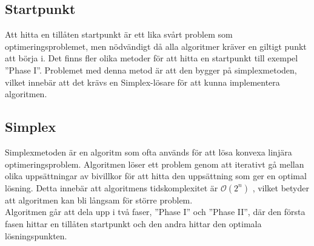 \subsection{Startpunkt}
Att hitta en tillåten startpunkt är ett lika svårt problem som optimeringsproblemet, men nödvändigt då alla algoritmer kräver en giltigt punkt att börja i. Det finns fler olika metoder för att hitta en startpunkt till exempel ''Phase I''. Problemet med denna metod är att den bygger på simplexmetoden, vilket innebär att det krävs en Simplex-lösare för att kunna implementera algoritmen. \citep{numericaloptimization}

\subsection{Simplex}
Simplexmetoden är en algoritm som ofta används för att lösa konvexa linjära optimeringsproblem. Algoritmen löser ett problem genom att iterativt gå mellan olika uppsättningar av bivillkor för att hitta den uppsättning som ger en optimal lösning. Detta innebär att algoritmens tidskomplexitet är $\mathcal{O}(2^n)$ \citep{numericaloptimization}, vilket betyder att algoritmen kan bli långsam för större problem. \\
Algoritmen går att dela upp i två faser, ''Phase I'' och ''Phase II'', där den första fasen hittar en tillåten startpunkt och den andra hittar den optimala lösningspunkten.

